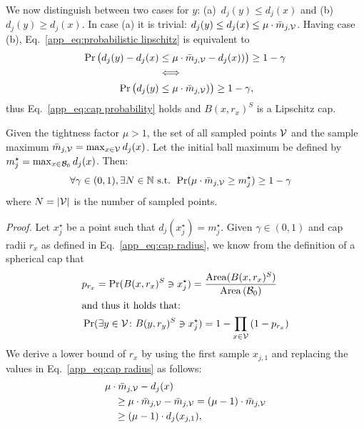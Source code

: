 We now distinguish between two cases for $y$: (a)~$d_j(y)\le d_j(x)$ and (b)~$d_j(y) \ge d_j(x)$. In case (a) it is trivial: $d_j(y) \le d_j(x) \le \mu \cdot \bar{m}_{j,\mathcal{V}}$. Having case (b), Eq.~\eqref{app_eq:probabilistic lipschitz} is equivalent to
\begin{align}
    \Pr\big(d_j(y) - d_j(x) &\le \mu\cdot\bar{m}_{j,\mathcal{V}}-d_j(x))\big) \ge 1-\gamma\nonumber\\ &\Longleftrightarrow\nonumber\\
    \Pr\big(d_j(y) &\le \mu\cdot\bar{m}_{j,\mathcal{V}})\big) \ge 1-\gamma,
\end{align}
thus Eq.~\eqref{app_eq:cap probability} holds and $B(x,r_x)^S$ is a Lipschitz cap.

\begin{theorem}\label{app_thm:stochastic guarantee} Given the tightness factor $\mu > 1$, the set of all sampled points $\mathcal{V}$ and the sample maximum $\bar{m}_{j,\mathcal{V}} = \max_{x\in\mathcal{V}} d_j(x)$. Let the initial ball maximum be defined by $m^\star_j=\max_{x\in\mathcal{B}_0} d_j(x)$. Then:
    \begin{align}\label{app_eq:stochastic guarantee}
        \hspace*{-2ex}\forall\gamma\in(0,1),\exists N\in\mathbb{N}\textrm{ s.t. }
        \Pr(\mu\cdot\bar{m}_{j,\calV}\ge m^\star_j) \ge 1-\gamma
    \end{align}
    where $N=|\mathcal{V}|$ is the number of sampled points.
\end{theorem}
\emph{Proof.} Let $x^\star_j$ be a point such that $d_j(x^\star_j) = m^\star_j$. Given $\gamma\in(0,1)$ and cap radii $r_x$ as defined in Eq.~\eqref{app_eq:cap radius}, we know from the definition of a spherical cap that
\begin{align}
    &p_{r_x} = \Pr(B(x, r_x)^S\owns x_j^\star) = \frac{\operatorname{Area}(B(x, r_x)^S)}{\operatorname{Area}{(\mathcal{B}_0})}\\
    &\textrm{and thus it holds that:}\nonumber\\
    &\Pr(\exists y\in\mathcal{V}\colon B(y, r_y)^S\owns x_j^\star) = 1 - \prod_{x\in\mathcal{V}} \left(
        1 - p_{r_x}
        \right)
\end{align}
We derive a lower bound of $r_x$ by using the first sample $x_{j,1}$ and replacing the values in Eq.~\eqref{app_eq:cap radius} as follows:
\begin{align}
    &\mu\cdot \bar{m}_{j,\mathcal{V}} - d_j(x) \\
    &\quad\ge \mu\cdot \bar{m}_{j,\mathcal{V}} - \bar{m}_{j,\mathcal{V}} = (\mu - 1)\cdot \bar{m}_{j,\mathcal{V}} \\
    &\quad\ge (\mu - 1) \cdot d_j(x_{j,1}),
\end{align}
